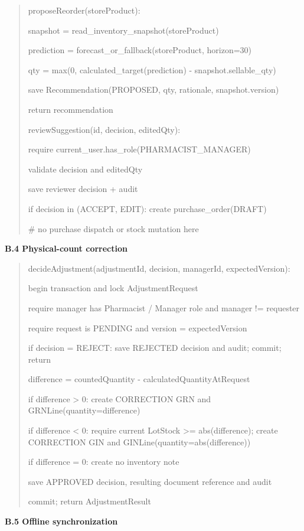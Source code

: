 \begin{quote}
proposeReorder(storeProduct):

snapshot = read\_inventory\_snapshot(storeProduct)

prediction = forecast\_or\_fallback(storeProduct, horizon=30)

qty = max(0, calculated\_target(prediction) - snapshot.sellable\_qty)

save Recommendation(PROPOSED, qty, rationale, snapshot.version)

return recommendation

reviewSuggestion(id, decision, editedQty):

require current\_user.has\_role(PHARMACIST\_MANAGER)

validate decision and editedQty

save reviewer decision + audit

if decision in (ACCEPT, EDIT): create purchase\_order(DRAFT)

\# no purchase dispatch or stock mutation here
\end{quote}

\textbf{B.4 Physical-count correction}

\begin{quote}
decideAdjustment(adjustmentId, decision, managerId, expectedVersion):

begin transaction and lock AdjustmentRequest

require manager has Pharmacist / Manager role and manager != requester

require request is PENDING and version = expectedVersion

if decision = REJECT: save REJECTED decision and audit; commit; return

difference = countedQuantity - calculatedQuantityAtRequest

if difference \textgreater{} 0: create CORRECTION GRN and GRNLine(quantity=difference)

if difference \textless{} 0: require current LotStock \textgreater= abs(difference); create CORRECTION GIN and GINLine(quantity=abs(difference))

if difference = 0: create no inventory note

save APPROVED decision, resulting document reference and audit

commit; return AdjustmentResult
\end{quote}

\textbf{B.5 Offline synchronization}

